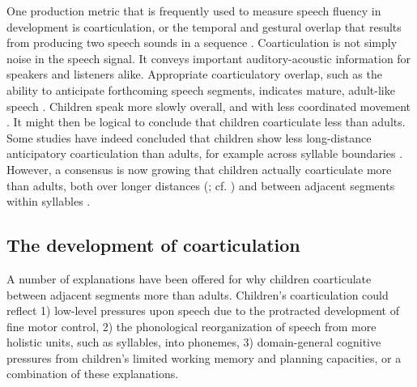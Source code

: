 \documentclass[a4paper,man,natbib,donotrepeattitle, apacite]{apa6}
\begin{document}
One production metric that is frequently used to measure speech fluency in development is coarticulation, or the temporal and gestural overlap that results from producing two speech sounds in a sequence \cite{gerosaAnalyzingChildrenSpeech2006,goffmanBreadthCoarticulatoryUnits2008,zharkovaCoarticulationIndicatorSpeech2011}. Coarticulation is not simply noise in the speech signal. It conveys important auditory-acoustic information for speakers and listeners alike. Appropriate coarticulatory overlap, such as the ability to anticipate forthcoming speech segments, indicates mature, adult-like speech \cite{barbierWhatAnticipatoryCoarticulation2020,bradlowConfluentTalkerListeneroriented2002,whalenCoarticulationLargelyPlanned1990}. Children speak more slowly overall, and with less coordinated movement \cite{greenPhysiologicDevelopmentSpeech2000,goffmanRelationsSegmentalMotor2007,leeAcousticsChildrenSpeech1999}. It might then be logical to conclude that children coarticulate less than adults. Some studies have indeed concluded that children show less long-distance anticipatory coarticulation than adults, for example across syllable boundaries \cite{barbierWhatAnticipatoryCoarticulation2020}. However, a consensus is now growing that children actually coarticulate more than adults, both over longer distances (; cf. ) and between adjacent segments within syllables \cite{nittrouerEmergencePhoneticSegments1989,nittrouerHowChildrenLearn1996,noirayBackFutureNonlinear2019,rubertusVocalicActivationWidth2020,zharkovaCoarticulationIndicatorSpeech2011,zharkovaSpatialTemporalLingual2014}. 

\subsection{The development of coarticulation}

A number of explanations have been offered for why children coarticulate between adjacent segments more than adults. Children’s coarticulation could reflect 1) low-level pressures upon speech due to the protracted development of fine motor control, 2) the phonological reorganization of speech from more holistic units, such as syllables, into phonemes, 3) domain-general cognitive pressures from children's limited working memory and planning capacities, or a combination of these explanations. 
\end{document}
